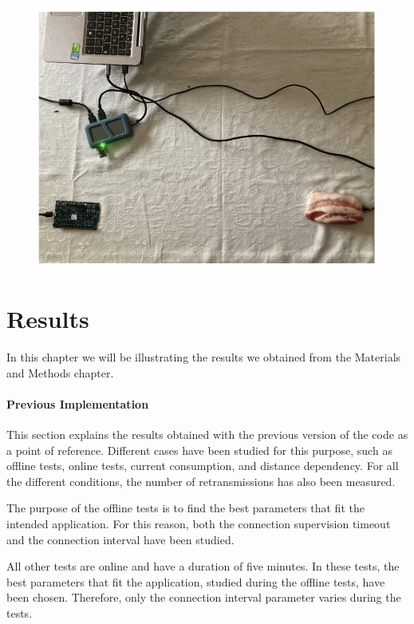 \documentclass{Configuration_Files/PoliMi3i_thesis}
\begin{document}
\begin{figure}[H]
    \centering
    \includegraphics[scale=0.3]{Test_Procedure/23.png}
    \label{fig:direct_communication_board_PC}
\end{figure}

\chapter{Results}

In this chapter we will be illustrating the results we obtained from the Materials and
Methods chapter.

\subsubsection*{Previous Implementation}

This section explains the results obtained with the previous version of the code as a point of reference. Different cases have been studied for this purpose, such as offline tests, online tests, current consumption, and distance dependency. For all the different conditions, the number of retransmissions has also been measured.

The purpose of the offline tests is to find the best parameters that fit the intended application. For this reason, both the connection supervision timeout and the connection interval have been studied.

All other tests are online and have a duration of five minutes. In these tests, the best parameters that fit the application, studied during the offline tests, have been chosen. Therefore, only the connection interval parameter varies during the tests.
\end{document}
